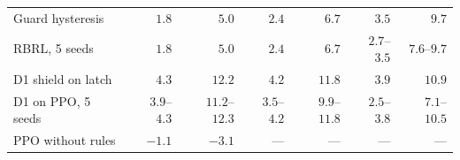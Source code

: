 \begin{table}[!ht]
\begin{tabular*}{\textwidth}{@{\extracolsep{\fill}}lrrrrrr@{}}
Guard hysteresis & $1.8$ & $5.0$ & $2.4$ & $6.7$ & $3.5$ & $9.7$ \\
RBRL, 5 seeds & $1.8$ & $5.0$ & $2.4$ & $6.7$ & $2.7$--$3.5$ & $7.6$--$9.7$ \\
D1 shield on latch & $4.3$ & $12.2$ & $4.2$ & $11.8$ & $3.9$ & $10.9$ \\
D1 on PPO, 5 seeds & $3.9$--$4.3$ & $11.2$--$12.3$ & $3.5$--$4.2$ & $9.9$--$11.8$ & $2.5$--$3.8$ & $7.1$--$10.5$ \\
PPO without rules & $-1.1$ & $-3.1$ & --- & --- & --- & --- \\
\bottomrule
\end{tabular*}
\end{table}
